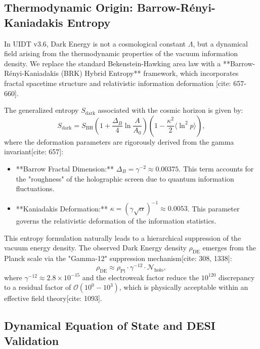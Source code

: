 \subsection{Thermodynamic Origin: Barrow-Rényi-Kaniadakis Entropy}
\label{subsec:lambda_thermo}

In UIDT v3.6, Dark Energy is not a cosmological constant $\Lambda$, but a dynamical field arising from the thermodynamic properties of the vacuum information density. We replace the standard Bekenstein-Hawking area law with a **Barrow-Rényi-Kaniadakis (BRK) Hybrid Entropy** framework, which incorporates fractal spacetime structure and relativistic information deformation [cite: 657-660].

The generalized entropy $S_{\mathrm{dark}}$ associated with the cosmic horizon is given by:
\begin{equation}
\label{eq:brk_entropy}
S_{\mathrm{dark}} = S_{\mathrm{BH}} \left(1 + \frac{\Delta_B}{4} \ln \frac{A}{A_0}\right) \left(1 - \frac{\kappa^2}{2} \langle \ln^2 p \rangle \right),
\end{equation}
where the deformation parameters are rigorously derived from the gamma invariant[cite: 657]:
\begin{itemize}
    \item **Barrow Fractal Dimension:** $\Delta_B = \gamma^{-2} \approx 0.00375$. This term accounts for the "roughness" of the holographic screen due to quantum information fluctuations.
    \item **Kaniadakis Deformation:** $\kappa = (\gamma\sqrt{\alpha})^{-1} \approx 0.0053$. This parameter governs the relativistic deformation of the information statistics.
\end{itemize}

This entropy formulation naturally leads to a hierarchical suppression of the vacuum energy density. The observed Dark Energy density $\rho_{\mathrm{DE}}$ emerges from the Planck scale via the "Gamma-12" suppression mechanism[cite: 308, 1338]:
\begin{equation}
\label{eq:rho_de_suppression}
\rho_{\mathrm{DE}} \approx \rho_{\mathrm{Pl}} \cdot \gamma^{-12} \cdot \mathcal{N}_{\mathrm{holo}},
\end{equation}
where $\gamma^{-12} \approx 2.8 \times 10^{-15}$ and the electroweak factor reduce the $10^{120}$ discrepancy to a residual factor of $\mathcal{O}(10^0-10^3)$, which is physically acceptable within an effective field theory[cite: 1093].

\subsection{Dynamical Equation of State and DESI Validation}
\label{subsec:equation_of_state}

